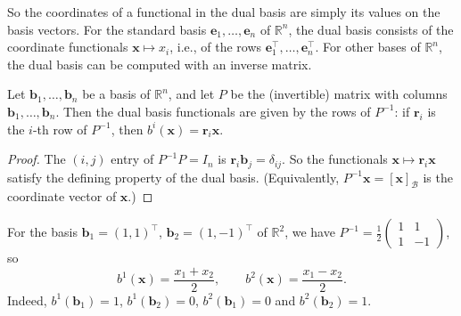 So the coordinates of a functional in the dual basis are simply its values on the basis vectors. For the standard basis $\mathbf{e}_1, \ldots, \mathbf{e}_n$ of $\mathbb{R}^n$, the dual basis consists of the coordinate functionals $\mathbf{x} \mapsto x_i$, i.e., of the rows $\mathbf{e}_1^\top, \ldots, \mathbf{e}_n^\top$. For other bases of $\mathbb{R}^n$, the dual basis can be computed with an inverse matrix.

\begin{proposition}\label{L1-prop:dual-basis-compute}
    Let $\mathbf{b}_1, \ldots, \mathbf{b}_n$ be a basis of $\mathbb{R}^n$, and let $P$ be the (invertible) matrix with columns $\mathbf{b}_1, \ldots, \mathbf{b}_n$. Then the dual basis functionals are given by the rows of $P^{-1}$: if $\mathbf{r}_i$ is the $i$-th row of $P^{-1}$, then $b^i(\mathbf{x}) = \mathbf{r}_i \mathbf{x}$.
\end{proposition}

\begin{proof}
    The $(i, j)$ entry of $P^{-1}P = I_n$ is $\mathbf{r}_i \mathbf{b}_j = \delta_{ij}$. So the functionals $\mathbf{x} \mapsto \mathbf{r}_i \mathbf{x}$ satisfy the defining property of the dual basis. (Equivalently, $P^{-1}\mathbf{x} = [\mathbf{x}]_{\mathcal{B}}$ is the coordinate vector of $\mathbf{x}$.)
\end{proof}

\begin{example}
    For the basis $\mathbf{b}_1 = (1, 1)^\top$, $\mathbf{b}_2 = (1, -1)^\top$ of $\mathbb{R}^2$, we have $P^{-1} = \frac{1}{2}\begin{pmatrix} 1 & 1 \\ 1 & -1 \end{pmatrix}$, so
    \[b^1(\mathbf{x}) = \frac{x_1 + x_2}{2}, \qquad b^2(\mathbf{x}) = \frac{x_1 - x_2}{2}.\]
    Indeed, $b^1(\mathbf{b}_1) = 1$, $b^1(\mathbf{b}_2) = 0$, $b^2(\mathbf{b}_1) = 0$ and $b^2(\mathbf{b}_2) = 1$.
\end{example}

